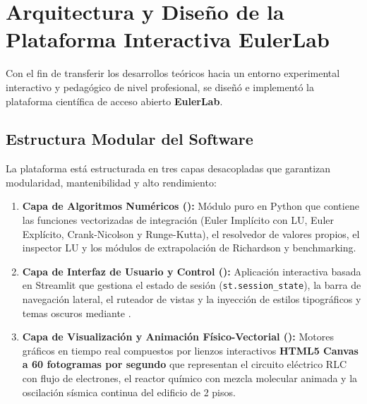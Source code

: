 \documentclass[11pt,a4paper]{article}
\begin{document}
\section{Arquitectura y Diseño de la Plataforma Interactiva EulerLab}

Con el fin de transferir los desarrollos teóricos hacia un entorno experimental interactivo y pedagógico de nivel profesional, se diseñó e implementó la plataforma científica de acceso abierto \textbf{EulerLab}.

\subsection{Estructura Modular del Software}
La plataforma está estructurada en tres capas desacopladas que garantizan modularidad, mantenibilidad y alto rendimiento:
\begin{enumerate}
    \item \textbf{Capa de Algoritmos Numéricos ():} Módulo puro en Python que contiene las funciones vectorizadas de integración (Euler Implícito con LU, Euler Explícito, Crank-Nicolson y Runge-Kutta), el resolvedor de valores propios, el inspector LU y los módulos de extrapolación de Richardson y benchmarking.
    \item \textbf{Capa de Interfaz de Usuario y Control ():} Aplicación interactiva basada en Streamlit que gestiona el estado de sesión (\texttt{st.session\_state}), la barra de navegación lateral, el ruteador de vistas y la inyección de estilos tipográficos y temas oscuros mediante .
    \item \textbf{Capa de Visualización y Animación Físico-Vectorial ():} Motores gráficos en tiempo real compuestos por lienzos interactivos \textbf{HTML5 Canvas a 60 fotogramas por segundo} que representan el circuito eléctrico RLC con flujo de electrones, el reactor químico con mezcla molecular animada y la oscilación sísmica continua del edificio de 2 pisos.
\end{enumerate}
\end{document}
